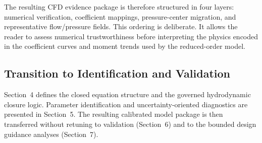 The resulting CFD evidence package is therefore structured in four layers: numerical verification, coefficient mappings, pressure-center migration, and representative flow/pressure fields. This ordering is deliberate. It allows the reader to assess numerical trustworthiness before interpreting the physics encoded in the coefficient curves and moment trends used by the reduced-order model.


\subsection{Transition to Identification and Validation}

Section~4 defines the closed equation structure and the governed hydrodynamic closure logic. Parameter identification and uncertainty-oriented diagnostics are presented in Section~5. The resulting calibrated model package is then transferred without retuning to validation (Section~6) and to the bounded design guidance analyses (Section~7).
